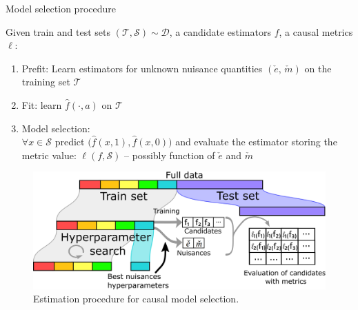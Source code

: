 \documentclass[french,12pt,twoside,a4paper]{book}
\begin{document}
\begin{minipage}{.4\textwidth}
  \begin{algorithm}[H]
    \caption{Model selection procedure}\label{problem:estimation_procedure:algo} {%
      Given train and test sets $(\mathcal{T}, \mathcal{S}) \sim \mathcal{D}$,
      a candidate estimators $f$, a causal
      metrics $\ell$:
      \begin{enumerate}
        \item Prefit: Learn estimators for unknown nuisance quantities $(\check e,\,\check m)$ on the training set $\mathcal{T}$
        \item Fit: learn $\hat f(\cdot, a)$ on
              $\mathcal T$
        \item Model selection: \\
              $\forall{x} \in \mathcal{S}$ predict
              $\big(\hat f(x, 1), \hat f(x, 0)\big)$ and evaluate the estimator storing the metric value: $\ell(f, \mathcal S)$ -- possibly
              function of $\check e$ and $\check m$
      \end{enumerate}

    }
  \end{algorithm}
\end{minipage}
\begin{minipage}{.55\textwidth}
  \begin{figure}[H]
    \includegraphics[width=\linewidth]{img/chapter_5/estimation_procedure_causal_selection_procedure.png}
    \caption{Estimation procedure for causal model
      selection.}\label{problem:estimation_procedure:figure}
  \end{figure}
\end{minipage}
\end{document}
